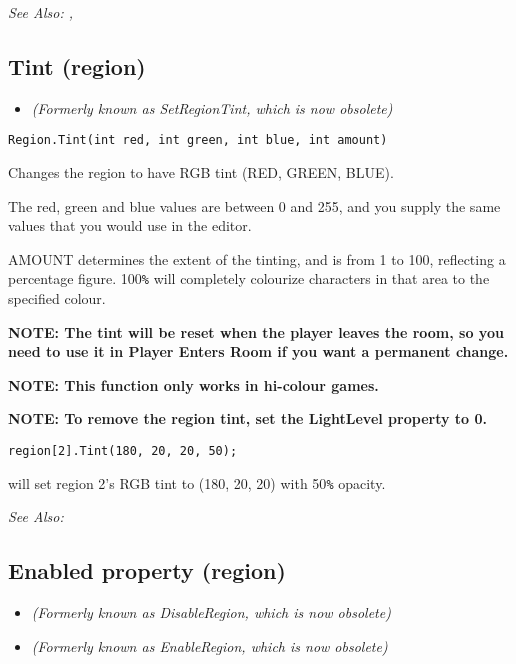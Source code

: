 \it{See Also:} ,


\subsection{Tint (region)}\label{Region.Tint}%

\begin{itemize}
\item \it{(Formerly known as SetRegionTint, which is now obsolete)} 
\end{itemize}

\begin{verbatim}
Region.Tint(int red, int green, int blue, int amount)
\end{verbatim}
Changes the region to have RGB tint (RED, GREEN, BLUE).

The red, green and blue values are between 0 and 255, and you supply the same
values that you would use in the editor.

AMOUNT determines the extent of the tinting, and is from 1 to 100, reflecting a percentage
figure. 100\verb$%$ will completely colourize characters in that area to the specified colour.

\bf{NOTE}: The tint will be reset when the player leaves the room,
so you need to use it in Player Enters Room if you want a permanent
change.

\bf{NOTE:} This function only works in hi-colour games.

\bf{NOTE}: To remove the region tint, set the LightLevel property to 0.

\begin{verbatim}
region[2].Tint(180, 20, 20, 50);
\end{verbatim}
will set region 2's RGB tint to (180, 20, 20) with 50\verb$%$ opacity.

\it{See Also:} 



\subsection{Enabled property (region)}\label{Region.Enabled}%

\begin{itemize}
\item \it{(Formerly known as DisableRegion, which is now obsolete)}
\item \it{(Formerly known as EnableRegion, which is now obsolete)} 
\end{itemize}


